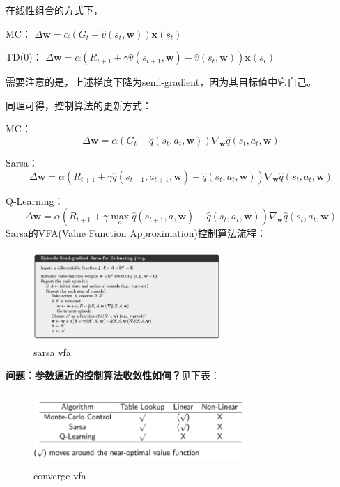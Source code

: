 \documentclass[UTF8]{ctexart}
\begin{document}
在线性组合的方式下，

MC：
$\Delta \mathbf{w}=\alpha\left(G_{t}-\hat{v}(s_t, \mathbf{w})\right) \mathbf{x}(s_t)$

TD(0)：
$\Delta \mathbf{w}=\alpha\left(R_{t+1} + \gamma \hat{v}(s_{t+1}, \mathbf{w})-\hat{v}(s_t, \mathbf{w})\right)  \mathbf{x}(s_t)$

需要注意的是，上述梯度下降为semi-gradient，因为其目标值中它自己。

同理可得，控制算法的更新方式：

MC：
\begin{equation}\Delta \mathbf{w}=\alpha\left(G_{t}-\hat{q}\left(s_{t}, a_{t}, \mathbf{w}\right)\right) \nabla_{\mathbf{w}} \hat{q}\left(s_{t}, a_{t}, \mathbf{w}\right)\end{equation}

Sarsa：
\begin{equation}\Delta \mathbf{w}=\alpha\left(R_{t+1}+\gamma \hat{q}\left(s_{t+1}, a_{t+1}, \mathbf{w}\right)-\hat{q}\left(s_{t}, a_{t}, \mathbf{w}\right)\right) \nabla_{\mathbf{w}} \hat{q}\left(s_{t}, a_{t}, \mathbf{w}\right)\end{equation}

Q-Learning：
\begin{equation}\Delta \mathbf{w}=\alpha\left(R_{t+1}+\gamma \max _{a} \hat{q}\left(s_{t+1}, a, \mathbf{w}\right)-\hat{q}\left(s_{t}, a_{t}, \mathbf{w}\right)\right) \nabla_{\mathbf{w}} \hat{q}\left(s_{t}, a_{t}, \mathbf{w}\right)\end{equation}
Sarsa的VFA(Value Function Approximation)控制算法流程：

\begin{figure}[htbp]
	\centering
	\includegraphics[width=7.1cm, height=3.5cm]{./pic/sarsa_vfa.png}
    \caption{sarsa vfa}
    \label{sarsa:vfa}
\end{figure}

\textbf{问题：参数逼近的控制算法收敛性如何？}见下表：

\begin{figure}[htbp]
	\centering
	\includegraphics[width=8.1cm, height=2.8cm]{./pic/converge_vfa.png}
    \caption{converge vfa}
    \label{converge:vfa}
\end{figure}
\end{document}
